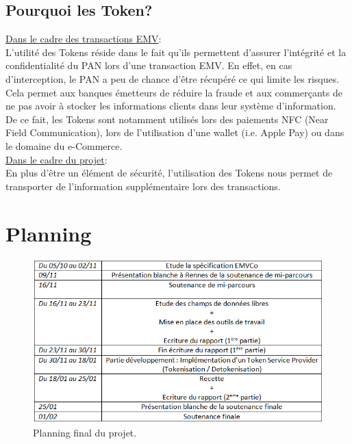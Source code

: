 \documentclass{report}
\begin{document}
\subsection{Pourquoi les Token?}
\noindent
\underline{Dans le cadre des transactions EMV}:\\

\noindent
L'utilité des Tokens réside dans le fait qu'ils permettent d'assurer l'intégrité et la confidentialité du PAN lors d'une transaction EMV. En effet, en cas d'interception, le PAN a peu de chance d'être récupéré ce qui limite les risques. Cela permet aux banques émetteurs de réduire la fraude et aux commerçants de ne pas avoir à stocker les informations clients dans leur système d'information.\\

\noindent
De ce fait, les Tokens sont notamment utilisés lors des paiements NFC (Near Field Communication), lors de l'utilisation d'une wallet (i.e. Apple Pay) ou dans le domaine du e-Commerce.\\

\noindent
\underline{Dans le cadre du projet}:\\

\noindent
En plus d'être un élément de sécurité, l'utilisation des Tokens nous permet de transporter de l'information supplémentaire lors des transactions.


\newpage
\section{Planning}
\begin{figure}[!ht]
    \centering
			\includegraphics[scale=0.9]{img/planningFinal.png}
			\caption{\label{Planning} Planning final du projet.}			
\end{figure}
\end{document}
